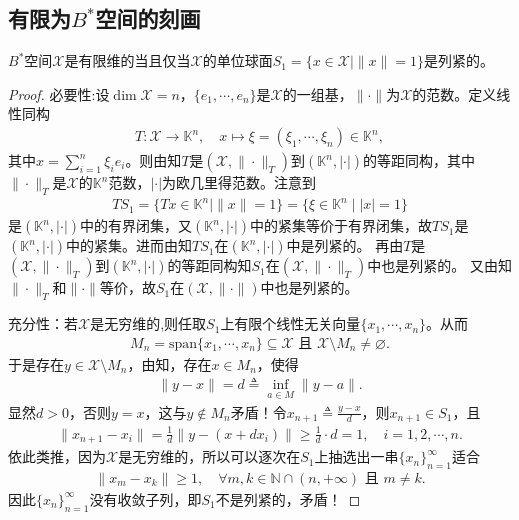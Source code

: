 \documentclass[../../main.tex]{subfiles}%
\begin{document}
\subsection{有限为$B^*$空间的刻画}

\begin{theorem}\label{theorem:有限维B空间的充要条件11}
$B^*$空间$\mathscr{X}$是有限维的当且仅当$\mathscr{X}$的单位球面$S_1 = \{x \in \mathscr{X} \mid \|x\|=1\}$是列紧的。
\end{theorem}
\begin{proof}

{\heiti 必要性:}设$\dim\mathscr{X}=n$，$\{e_1,\cdots,e_n\}$是$\mathscr{X}$的一组基，$\|\cdot\|$为$\mathscr{X}$的范数。定义线性同构
\begin{align*}
T:\mathscr{X}\to\mathbb{K}^n,\quad x\mapsto\xi=(\xi_1,\cdots,\xi_n)\in\mathbb{K}^n,
\end{align*}
其中$x=\sum\limits_{i=1}^n\xi_ie_i$。则由知$T$是$(\mathscr{X},\|\cdot\|_T)$到$(\mathbb{K}^n,|\cdot|)$的等距同构，其中$\|\cdot\|_T$是$\mathscr{X}$的$\mathbb{K}^n$范数，$|\cdot|$为欧几里得范数。注意到
\begin{align*}
TS_1=\{Tx\in\mathbb{K}^n\mid\|x\|=1\}=\{\xi\in\mathbb{K}^n\mid|x|=1\}
\end{align*}
是$(\mathbb{K}^n,|\cdot|)$中的有界闭集，又$(\mathbb{K}^n,|\cdot|)$中的紧集等价于有界闭集，故$TS_1$是$(\mathbb{K}^n,|\cdot|)$中的紧集。进而由知$TS_1$在$(\mathbb{K}^n,|\cdot|)$中是列紧的。
再由$T$是$(\mathscr{X},\|\cdot\|_T)$到$(\mathbb{K}^n,|\cdot|)$的等距同构知$S_1$在$(\mathscr{X},\|\cdot\|_T)$中也是列紧的。
又由知$\|\cdot\|_T$和$\|\cdot\|$等价，故$S_1$在$(\mathscr{X},\|\cdot\|)$中也是列紧的。

{\heiti 充分性：}若$\mathscr{X}$是无穷维的,则任取$S_1$上有限个线性无关向量$\{x_1,\cdots,x_n\}$。从而
\begin{align*}
M_n=\mathrm{span}\{x_1,\cdots,x_n\}\subseteq\mathscr{X} \text{ 且 } \mathscr{X}\setminus M_n\neq\varnothing.
\end{align*}
于是存在$y\in\mathscr{X}\setminus M_n$，由知，存在$x\in M_n$，使得
\begin{align*}
\|y-x\|=d\triangleq\inf\limits_{a\in M}\|y-a\|.
\end{align*}
显然$d>0$，否则$y=x$，这与$y\notin M_n$矛盾！令$x_{n+1}\triangleq\frac{y-x}{d}$，则$x_{n+1}\in S_1$，且
\begin{align*}
\|x_{n+1}-x_i\|=\frac{1}{d}\|y-(x+dx_i)\|\geqslant\frac{1}{d}\cdot d=1,\quad i=1,2,\cdots,n.
\end{align*}
依此类推，因为$\mathscr{X}$是无穷维的，所以可以逐次在$S_1$上抽选出一串$\{x_n\}_{n=1}^{\infty}$适合
\begin{align*}
\|x_m-x_k\|\geqslant1,\quad \forall m,k\in\mathbb{N}\cap(n,+\infty) \text{ 且 } m\neq k.
\end{align*}
因此$\{x_n\}_{n=1}^{\infty}$没有收敛子列，即$S_1$不是列紧的，矛盾！

\end{proof}
\end{document}
